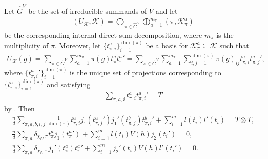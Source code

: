 \noindent\begin{lemma}\label{UKDecomp} Let $\hat{G}^V$ be the set of irreducible summands of $V$ and let
\begin{align*}
(U_\mathcal{K}, \mathcal{K}) = \bigoplus_{\pi \in \hat{G}^V}\bigoplus_{a=1}^{m_\pi} (\pi, \mathcal{K}_\pi^a)
\end{align*}
\noindent be the corresponding internal direct sum decomposition, where $m_\pi$ is the multiplicity of $\pi$. Moreover, let $\{t_{\pi,i}^a\}_{i=1}^{\dim(\pi)}$ be a basis for $\mathcal{K}_\pi^a \subseteq \mathcal{K}$ such that
\begin{align}
U_\mathcal{K}(g) = \sum_{\pi \in \hat{G}^V}\sum_{a=1}^{m_\pi}\pi(g) t_{\pi}^a {t_{\pi}^a}' = \sum_{\pi \in \hat{G}^V}\sum_{a=1}^{m_\pi}\sum_{i,j=1}^{\dim(\pi)}\pi(g)_{ij} t_{\pi,i}^a {t_{\pi,j}^a}',\label{IrreducibleBasis}
\end{align}
\noindent where $\{{t_{\pi,i}^a}'\}_{i=1}^{\dim(\pi)}$ is the unique set of projections corresponding to $\{t_{\pi,i}^a\}_{i=1}^{\dim(\pi)}$ and satisfying
\begin{align*}
\sum_{\pi,a,i} t_{\pi,i}^a{t_{\pi,i}^a}' = T
\end{align*}
\noindent by \cite[Theorem VIII.2.2]{Mac13}. Then
\begin{gather}
\frac{n}{d}\sum_{\pi,a,b,i,j}\frac{1}{\dim(\pi)}t_{\pi,i}^a j_1({t_{\pi,j}^a}')j_1'(t_{\pi,j}^b){t_{\pi,i}^b}' + \sum_{i=1}^m l(t_i)l'(t_i) = T \otimes T,\label{IrreducibleResult1}\\
\frac{n}{d} \sum_{\pi,a}\delta_{\chi_h,\pi} t_\pi^a j_1({t_\pi^a}') + \sum_{i=1}^m l(t_i)V(h)j_2(t_i') = 0,\label{IrreducibleResult2}\\
\frac{n}{d} \sum_{\pi,a}\delta_{\chi_h,\pi} j_1'(t_\pi^a){t_\pi^a}' + \sum_{i=1}^m j_2'(t_i)V(h)l'(t_i') = 0.\label{IrreducibleResult3}
\end{gather}
\noindent\\
\end{lemma}

